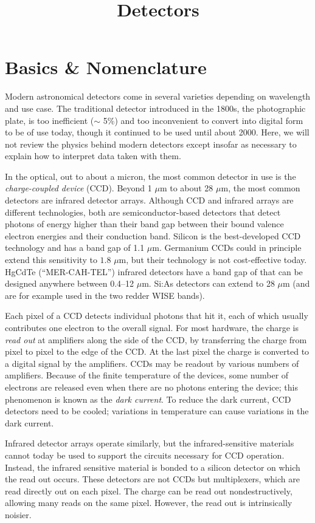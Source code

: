 \title{\bf Detectors}

\section{Basics \& Nomenclature}

Modern astronomical detectors come in several varieties depending on
wavelength and use case. The traditional detector introduced in the
1800s, the photographic plate, is too inefficient ($\sim$ 5\%) and too
inconvenient to convert into digital form to be of use today, though
it continued to be used until about 2000. Here, we will not review the
physics behind modern detectors except insofar as necessary to explain
how to interpret data taken with them.

In the optical, out to about a micron, the most common detector in use
is the {\it charge-coupled device} (CCD). Beyond 1 $\mu$m to about 28
$\mu$m, the most common detectors are infrared detector
arrays. Although CCD and infrared arrays are different technologies,
both are semiconductor-based detectors that detect photons of energy
higher than their band gap between their bound valence electron
energies and their conduction band. Silicon is the best-developed CCD
technology and has a band gap of 1.1 $\mu$m.  Germanium CCDs could in
principle extend this sensitivity to $1.8$ $\mu$m, but their
technology is not cost-effective today. HgCdTe (``MER-CAH-TEL'')
infrared detectors have a band gap of that can be designed anywhere
between 0.4--12 $\mu$m. Si:As detectors can extend to 28 $\mu$m (and
are for example used in the two redder WISE bands).

Each pixel of a CCD detects individual photons that hit it, each of
which usually contributes one electron to the overall signal. For most
hardware, the charge is {\it read out} at amplifiers along the side of
the CCD, by transferring the charge from pixel to pixel to the edge of
the CCD. At the last pixel the charge is converted to a digital signal
by the amplifiers. CCDs may be readout by various numbers of
amplifiers. Because of the finite temperature of the devices, some
number of electrons are released even when there are no photons
entering the device; this phenomenon is known as the {\it dark
current}. To reduce the dark current, CCD detectors need to be cooled;
variations in temperature can cause variations in the dark current.

Infrared detector arrays operate similarly, but the infrared-sensitive
materials cannot today be used to support the circuits necessary for
CCD operation. Instead, the infrared sensitive material is bonded to a
silicon detector on which the read out occurs. These detectors are not
CCDs but multiplexers, which are read directly out on each pixel. The
charge can be read out nondestructively, allowing many reads on the
same pixel. However, the read out is intrinsically noisier.

